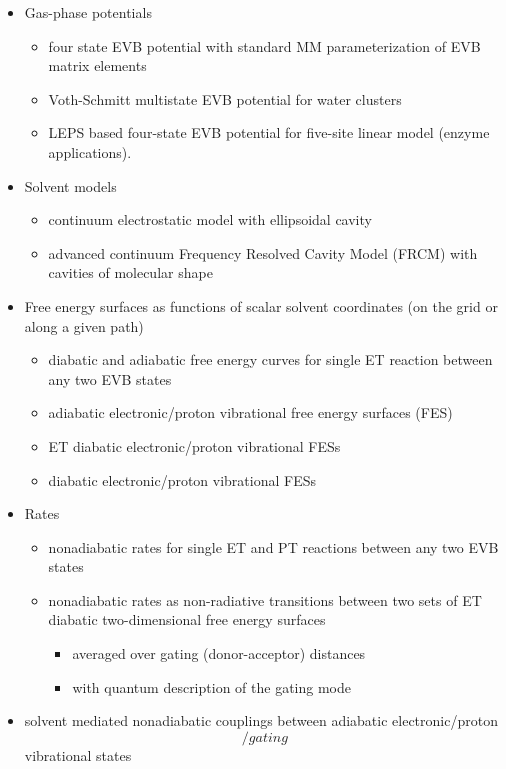 \documentclass[oneside,11pt,openany]{book}
\begin{document}
\begin{itemize}
\item Gas-phase potentials
\begin{itemize}
\item four state EVB potential with standard MM parameterization
      of EVB matrix elements \cite{pcet-jacs}
\item Voth-Schmitt multistate EVB potential for water clusters
      \cite{voth-schmitt}
\item LEPS based four-state EVB potential for five-site linear
      model (enzyme applications).
\end{itemize}

\item Solvent models
\begin{itemize}
\item continuum electrostatic model with ellipsoidal cavity
      \cite{Kirkwood38}
\item advanced continuum Frequency Resolved Cavity Model (FRCM)
      with cavities of molecular shape \cite{Rostov-1}
\end{itemize}

\item Free energy surfaces as functions of scalar solvent
      coordinates (on the grid or along a given path)
\begin{itemize}
\item diabatic and adiabatic free energy curves for single ET
      reaction between any two EVB states
\item adiabatic electronic/proton vibrational free energy surfaces (FES)
\item ET diabatic electronic/proton vibrational FESs
\item diabatic electronic/proton vibrational FESs
\end{itemize}

\item Rates
\begin{itemize}
\item nonadiabatic rates for single ET and PT reactions between
      any two EVB states
\item nonadiabatic rates as non-radiative transitions between
      two sets of ET diabatic two-dimensional free energy
      surfaces \cite{pcet-jcp2}
      \begin{itemize}
            \item averaged over gating (donor-acceptor) distances
            \item with quantum description of the gating mode
      \end{itemize}
\end{itemize}

\item solvent mediated nonadiabatic couplings between
      adiabatic electronic/proton\[/gating\] vibrational states

\end{itemize}
\end{document}
